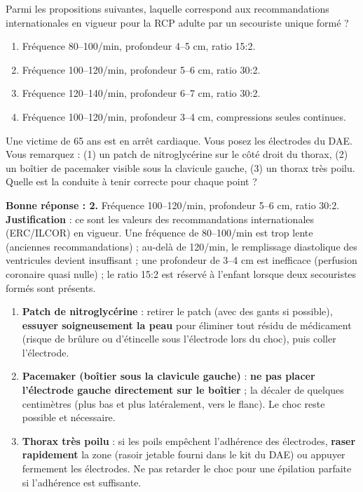 \documentclass[11pt]{article}
\begin{document}
\begin{exercice}
Parmi les propositions suivantes, laquelle correspond aux recommandations internationales en vigueur pour la RCP adulte par un secouriste unique formé ?
\begin{enumerate}
    \item Fréquence 80--100/min, profondeur 4--5 cm, ratio 15:2.
    \item Fréquence 100--120/min, profondeur 5--6 cm, ratio 30:2.
    \item Fréquence 120--140/min, profondeur 6--7 cm, ratio 30:2.
    \item Fréquence 100--120/min, profondeur 3--4 cm, compressions seules continues.
\end{enumerate}
\end{exercice}

\begin{exercice}
Une victime de 65 ans est en arrêt cardiaque. Vous posez les électrodes du DAE. Vous remarquez : (1) un patch de nitroglycérine sur le côté droit du thorax, (2) un boîtier de pacemaker visible sous la clavicule gauche, (3) un thorax très poilu. Quelle est la conduite à tenir correcte pour chaque point ?
\end{exercice}

\begin{corrige}[Exercice 1]
\textbf{Bonne réponse : 2.} Fréquence 100--120/min, profondeur 5--6 cm, ratio 30:2. \textbf{Justification} : ce sont les valeurs des recommandations internationales (ERC/ILCOR) en vigueur. Une fréquence de 80--100/min est trop lente (anciennes recommandations) ; au-delà de 120/min, le remplissage diastolique des ventricules devient insuffisant ; une profondeur de 3--4 cm est inefficace (perfusion coronaire quasi nulle) ; le ratio 15:2 est réservé à l'enfant lorsque deux secouristes formés sont présents.
\end{corrige}

\begin{corrige}[Exercice 2]
\begin{enumerate}
    \item \textbf{Patch de nitroglycérine} : retirer le patch (avec des gants si possible), \textbf{essuyer soigneusement la peau} pour éliminer tout résidu de médicament (risque de brûlure ou d'étincelle sous l'électrode lors du choc), puis coller l'électrode.
    \item \textbf{Pacemaker (boîtier sous la clavicule gauche)} : \textbf{ne pas placer l'électrode gauche directement sur le boîtier} ; la décaler de quelques centimètres (plus bas et plus latéralement, vers le flanc). Le choc reste possible et nécessaire.
    \item \textbf{Thorax très poilu} : si les poils empêchent l'adhérence des électrodes, \textbf{raser rapidement} la zone (rasoir jetable fourni dans le kit du DAE) ou appuyer fermement les électrodes. Ne pas retarder le choc pour une épilation parfaite si l'adhérence est suffisante.
\end{enumerate}
\end{corrige}
\end{document}
